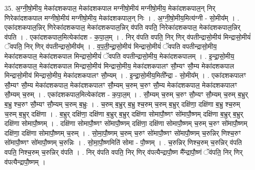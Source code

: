 \documentclass[17pt]{extarticle}
\begin{document}
35. अ॒ग्नी॒षो॒मीय॒ मेका॑दशकपाल॒ मेका॑दशकपाल मग्नीषो॒मीय॑ मग्नीषो॒मीय॒ मेका॑दशकपाल॒न् निर् णिरेका॑दशकपाल मग्नीषो॒मीय॑ मग्नीषो॒मीय॒ मेका॑दशकपाल॒न् निः । . अ॒ग्नी॒षो॒मीय॒मित्य॑ग्नी - सो॒मीय᳚म् । . एका॑दशकपाल॒न्निर् णिरेका॑दशकपाल॒ मेका॑दशकपाल॒न्निर् व॑पति वपति॒ निरेका॑दशकपाल॒ मेका॑दशकपाल॒न्निर् व॑पति । . एका॑दशकपाल॒मित्येका॑दश - क॒पा॒ल॒म् । . निर् व॑पति वपति॒ निर् णिर् व॑पतीन्द्रासो॒मीय॑ मिन्द्रासो॒मीयं॑ ॅवपति॒ निर् णिर् व॑पतीन्द्रासो॒मीय᳚म् । . व॒प॒ती॒न्द्रा॒सो॒मीय॑ मिन्द्रासो॒मीयं॑ ॅवपति वपतीन्द्रासो॒मीय॒ मेका॑दशकपाल॒ मेका॑दशकपाल मिन्द्रासो॒मीयं॑ ॅवपति वपतीन्द्रासो॒मीय॒ मेका॑दशकपालम् । . इ॒न्द्रा॒सो॒मीय॒ मेका॑दशकपाल॒ मेका॑दशकपाल मिन्द्रासो॒मीय॑ मिन्द्रासो॒मीय॒ मेका॑दशकपालꣳ सौ॒म्यꣳ सौ॒म्य मेका॑दशकपाल मिन्द्रासो॒मीय॑ मिन्द्रासो॒मीय॒ मेका॑दशकपालꣳ सौ॒म्यम् । . इ॒न्द्रा॒सो॒मीय॒मिती᳚न्द्रा - सो॒मीय᳚म् । . एका॑दशकपालꣳ सौ॒म्यꣳ सौ॒म्य मेका॑दशकपाल॒ मेका॑दशकपालꣳ सौ॒म्यम् च॒रुम् च॒रुꣳ सौ॒म्य मेका॑दशकपाल॒ मेका॑दशकपालꣳ सौ॒म्यम् च॒रुम् । . एका॑दशकपाल॒मित्येका॑दश - क॒पा॒ल॒म् । . सौ॒म्यम् च॒रुम् च॒रुꣳ सौ॒म्यꣳ सौ॒म्यम् च॒रुम् ब॒भ्रुर् ब॒भ्रु श्च॒रुꣳ सौ॒म्यꣳ सौ॒म्यम् च॒रुम् ब॒भ्रुः । . च॒रुम् ब॒भ्रुर् ब॒भ्रु श्च॒रुम् च॒रुम् ब॒भ्रुर् दक्षि॑णा॒ दक्षि॑णा ब॒भ्रु श्च॒रुम् च॒रुम् ब॒भ्रुर् दक्षि॑णा । . ब॒भ्रुर् दक्षि॑णा॒ दक्षि॑णा ब॒भ्रुर् ब॒भ्रुर् दक्षि॑णा सोमापौ॒ष्णꣳ सो॑मापौ॒ष्णम् दक्षि॑णा ब॒भ्रुर् ब॒भ्रुर् दक्षि॑णा सोमापौ॒ष्णम् । . दक्षि॑णा सोमापौ॒ष्णꣳ सो॑मापौ॒ष्णम् दक्षि॑णा॒ दक्षि॑णा सोमापौ॒ष्णम् च॒रुम् च॒रुꣳ सो॑मापौ॒ष्णम् दक्षि॑णा॒ दक्षि॑णा सोमापौ॒ष्णम् च॒रुम् । . सो॒मा॒पौ॒ष्णम् च॒रुम् च॒रुꣳ सो॑मापौ॒ष्णꣳ सो॑मापौ॒ष्णम् च॒रुन्निर् णिश्च॒रुꣳ सो॑मापौ॒ष्णꣳ सो॑मापौ॒ष्णम् च॒रुन्निः । . सो॒मा॒पौ॒ष्णमिति॑ सोमा - पौ॒ष्णम् । . च॒रुन्निर् णिश्च॒रुम् च॒रुन्निर् व॑पति वपति॒ निश्च॒रुम् च॒रुन्निर् व॑पति । . निर् व॑पति वपति॒ निर् णिर् व॑पत्यैन्द्रापौ॒ष्ण मै᳚न्द्रापौ॒ष्णं ॅव॑पति॒ निर् णिर् व॑पत्यैन्द्रापौ॒ष्णम् । \newline
\end{document}

